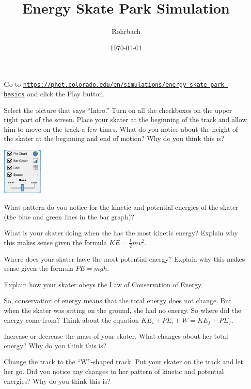 \documentclass[10pt]{exam}
\title{Energy Skate Park Simulation}
\author{Rohrbach}
\date{\today}
\begin{document}
\maketitle


\noindent
Go to \texttt{\href{https://phet.colorado.edu/en/simulations/energy-skate-park-basics}{https://phet.colorado.edu/en/simulations/energy-skate-park-basics}} and click the Play button.

\begin{questions}

\question
	Select the picture that says ``Intro.''  Turn on all the checkboxes on the upper right part of the screen. Place your skater at the beginning of the track and allow him to move on the track a few times.  What do you notice about the height of the skater at the beginning and end of motion?  Why do you think this is?
  
  \begin{flushright}
    \includegraphics[width=2cm]{PhET_checkboxes.png}
  \end{flushright}

\question
	What pattern do you notice for the kinetic and potential energies of the skater (the blue and green lines in the bar graph)?
  \vs

\question
	What is your skater doing when she has the most kinetic energy?  Explain why this makes sense given the formula $KE=\frac{1}{2}mv^2$.
  \vs 

\question
	Where does your skater have the most potential energy?  Explain why this makes sense given the formula $PE=mgh$.
  \vs 

\question
	Explain how your skater obeys the Law of Conservation of Energy.
  \vs 

\question
	So, conservation of energy means that the total energy does not change.  But when the skater was sitting on the ground, she had no energy.  So where did the energy come from?  Think about the equation $KE_i+PE_i+W=KE_f+PE_f$.
  \vs 

\pagebreak

\question
  Increase or decrease the mass of your skater.  What changes about her total energy?  Why do you think this is?
  \vs

\question
	Change the track to the ``W''-shaped track.  Put your skater on the track and let her go.  Did you notice any changes to her pattern of kinetic and potential energies?   Why do you think this is?
  

\end{questions}
\end{document}
